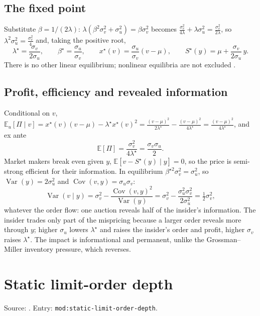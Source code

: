 \documentclass[a4paper,oneside,openany]{book}
\begin{document}
\subsection*{The fixed point}
Substitute $\beta=1/(2\lambda)$: $\lambda(\beta^2\sigma_v^2+\sigma_u^2)=\beta\sigma_v^2$ becomes $\frac{\sigma_v^2}{4\lambda}+\lambda\sigma_u^2=\frac{\sigma_v^2}{2\lambda}$, so $\lambda^2\sigma_u^2=\frac{\sigma_v^2}{4}$ and, taking the positive root,
\[ \lambda^\star=\frac{\sigma_v}{2\sigma_u},\qquad \beta^\star=\frac{\sigma_u}{\sigma_v},\qquad
x^\star(v)=\frac{\sigma_u}{\sigma_v}(v-\mu),\qquad S^\star(y)=\mu+\frac{\sigma_v}{2\sigma_u}\,y. \]
There is no other linear equilibrium; nonlinear equilibria are not excluded \citep[p.~97]{catalogue-0496}.

\subsection*{Profit, efficiency and revealed information}
Conditional on $v$, $\mathbb{E}_u[\Pi\mid v]=x^\star(v)(v-\mu)-\lambda^\star x^\star(v)^2=\frac{(v-\mu)^2}{2\lambda^\star}-\frac{(v-\mu)^2}{4\lambda^\star}=\frac{(v-\mu)^2}{4\lambda^\star}$, and ex ante
\[ \mathbb{E}[\Pi]=\frac{\sigma_v^2}{4\lambda^\star}=\frac{\sigma_v\sigma_u}{2}. \]
Market makers break even given $y$, $\mathbb{E}[v-S^\star(y)\mid y]=0$, so the price is semi-strong efficient for their information. In equilibrium $\beta^{\star2}\sigma_v^2=\sigma_u^2$, so $\operatorname{Var}(y)=2\sigma_u^2$ and $\operatorname{Cov}(v,y)=\sigma_u\sigma_v$:
\[ \operatorname{Var}(v\mid y)=\sigma_v^2-\frac{\operatorname{Cov}(v,y)^2}{\operatorname{Var}(y)}=\sigma_v^2-\frac{\sigma_u^2\sigma_v^2}{2\sigma_u^2}=\tfrac12\sigma_v^2, \]
whatever the order flow: one auction reveals half of the insider's information. The insider trades only part of the mispricing because a larger order reveals more through $y$; higher $\sigma_u$ lowers $\lambda^\star$ and raises the insider's order and profit, higher $\sigma_v$ raises $\lambda^\star$. The impact is informational and permanent, unlike the Grossman--Miller inventory pressure, which reverses.

\section*{Static limit-order depth}

Source: \citep[chap.~``A Primer on the Microstructure of Financial Markets'', pp.~28--30, eq.~(2.3)]{crypto-cartea}. Entry: \texttt{mod:static-limit-order-depth}.
\end{document}
